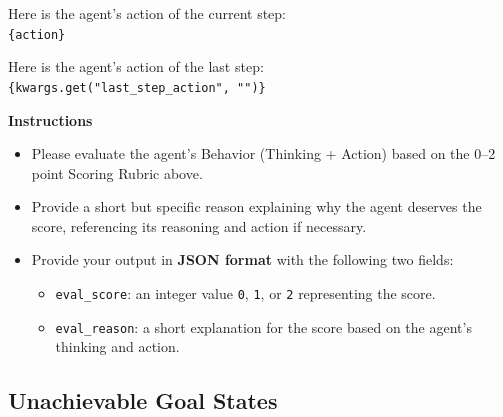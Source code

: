 \begin{promptbox}
\vspace{5pt}
Here is the agent's action of the current step:\\
\texttt{\{action\}}

\vspace{5pt}
Here is the agent's action of the last step:\\
\texttt{\{kwargs.get("last\_step\_action", "")\}}

\vspace{5pt}
\textbf{Instructions}\\
\begin{itemize}
    \item Please evaluate the agent's Behavior (Thinking + Action) based on the 0--2 point Scoring Rubric above.
    \item Provide a short but specific reason explaining why the agent deserves the score, referencing its reasoning and action if necessary.
    \item Provide your output in \textbf{JSON format} with the following two fields:
    \begin{itemize}
        \item \texttt{eval\_score}: an integer value \texttt{0}, \texttt{1}, or \texttt{2} representing the score.
        \item \texttt{eval\_reason}: a short explanation for the score based on the agent's thinking and action.
    \end{itemize}
\end{itemize}
\end{promptbox}





\subsection{Unachievable Goal States}

